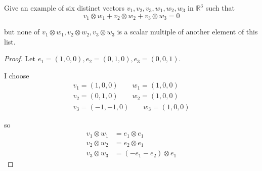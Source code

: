 \begin{exercise}\label{chapter9:sectionD:exercise2}
    Give an example of six distinct vectors $v_{1}, v_{2}, v_{3}, w_{1}, w_{2}, w_{3}$ in $\mathbb{R}^{3}$ such that
    \[
        v_{1}\otimes w_{1} + v_{2}\otimes w_{2} + v_{3}\otimes w_{3} = 0
    \]

    but none of $v_{1}\otimes w_{1}, v_{2}\otimes w_{2}, v_{3}\otimes w_{3}$ is a scalar multiple of another element of this list.
\end{exercise}

\begin{proof}
    Let $e_{1} = (1, 0, 0), e_{2} = (0, 1, 0), e_{3} = (0, 0, 1)$.

    I choose
    \[
        \begin{split}
            v_{1} = (1, 0, 0)\qquad w_{1} = (1, 0, 0) \\
            v_{2} = (0, 1, 0)\qquad w_{2} = (1, 0, 0) \\
            v_{3} = (-1, -1, 0)\qquad w_{3} = (1, 0, 0)
        \end{split}
    \]

    so
    \begin{align*}
        v_{1}\otimes w_{1} & = e_{1}\otimes e_{1}          \\
        v_{2}\otimes w_{2} & = e_{2}\otimes e_{1}          \\
        v_{3}\otimes w_{3} & = (-e_{1}-e_{2})\otimes e_{1}
    \end{align*}


\end{proof}
